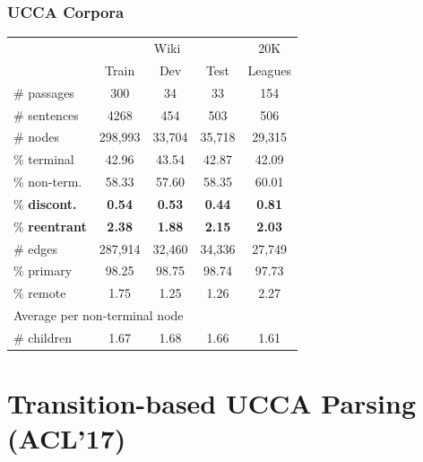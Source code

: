 \documentclass[t,xcolor={svgnames}]{beamer}
\begin{document}
\begin{frame}
\frametitle{UCCA Corpora}
\centering
\begin{tabular}{l|ccc|c}
	& \multicolumn{3}{c|}{Wiki} & 20K \\
	& \small Train & \small Dev & \small Test & Leagues \\
	\hline
	\# passages & 300 & 34 & 33 & 154 \\
	\# sentences & 4268 & 454 & 503 & 506 \\
	\hline
	\# nodes & 298,993 & 33,704 & 35,718 & 29,315 \\
	\% terminal & 42.96 & 43.54 & 42.87 & 42.09 \\
	\% non-term. & 58.33 & 57.60 & 58.35 & 60.01 \\
	\% \textbf{discont.} & \textbf{0.54} & \textbf{0.53} & \textbf{0.44} & \textbf{0.81} \\
	\% \textbf{reentrant} & \textbf{2.38} & \textbf{1.88} & \textbf{2.15} & \textbf{2.03} \\
	\hline
	\# edges & 287,914 & 32,460 & 34,336 & 27,749 \\
	\% primary & 98.25 & 98.75 & 98.74 & 97.73 \\
	\% remote & 1.75 & 1.25 & 1.26 & 2.27 \\
	\hline
	\multicolumn{3}{l}{\footnotesize Average per non-terminal node} \\
	\# children & 1.67 & 1.68 & 1.66 & 1.61 
\end{tabular}
\end{frame}



\section{Transition-based UCCA Parsing (ACL'17)}
\end{document}
